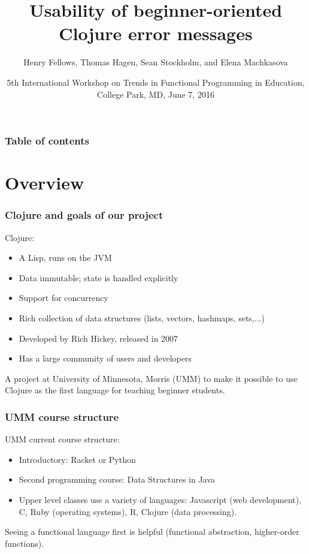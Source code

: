\documentclass{beamer}
\begin{document}
\title{Usability of beginner-oriented Clojure error messages}
\author{Henry Fellows, Thomas Hagen, Sean Stockholm, 
and Elena Machkasova}
\date{5th International Workshop on Trends in Functional Programming in Education, \\
College Park, MD, June 7, 2016}

\begin{frame}
\titlepage
\end{frame}

\begin{frame}
\frametitle{Table of contents}
\tableofcontents  
\end{frame}

\section{Overview}

\begin{frame}
\frametitle{Clojure and goals of our project }
Clojure:
\begin{itemize}
\item A Lisp, runs on the JVM
\item Data immutable; state is handled explicitly 
\item Support for concurrency 
\item Rich collection of data structures (lists, vectors, hashmaps, sets,...)
\item Developed by Rich Hickey, released in 2007
\item Has a large community of users and developers 
\end{itemize}

A project at University of Minnesota, Morris (UMM) to make it possible to use Clojure as the first language for teaching beginner students. 
\end{frame}

\begin{frame}
\frametitle{UMM course structure}
UMM current course structure:
\begin{itemize}
\item Introductory: Racket or Python 
\item Second programming course: Data Structures in Java
\item Upper level classes use a variety of languages:  Javascript (web development), C, Ruby (operating systems),  R, Clojure (data processing). 
\end{itemize} 
Seeing a functional language first is helpful (functional abstraction, higher-order functions). 

\end{frame}
\end{document}
